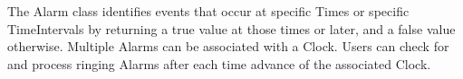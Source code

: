 
\label{sec:Alarm}
The Alarm class identifies events that occur at specific Times
or specific TimeIntervals by returning a true value at those times
or later, and a false value otherwise.  Multiple Alarms can be 
associated with a Clock.  Users can check for and process ringing
Alarms after each time advance of the associated Clock.
